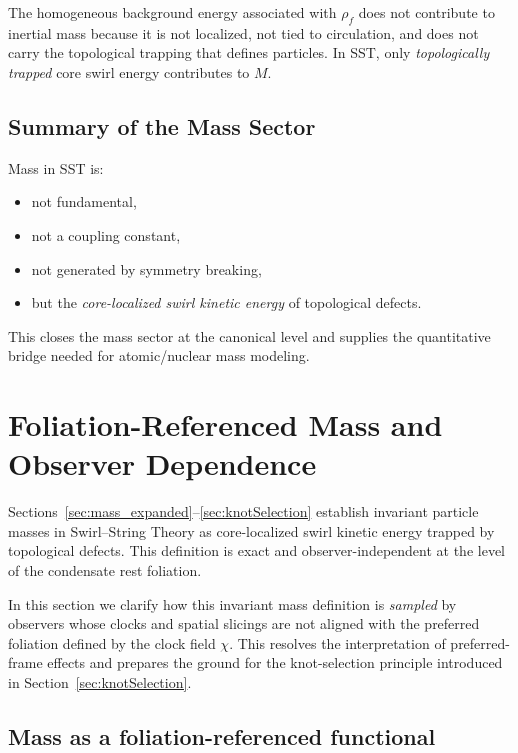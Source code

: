 \documentclass[10pt]{article}
\newcommand{\rhof}{\rho_{\!f}}                           %
\begin{document}
        The homogeneous background energy associated with $\rhof$ does not contribute to
        inertial mass because it is not localized, not tied to circulation, and does not
        carry the topological trapping that defines particles. In SST, only
        \emph{topologically trapped} core swirl energy contributes to $M$.

    \subsection{Summary of the Mass Sector}

        Mass in SST is:
        \begin{itemize}
            \item not fundamental,
            \item not a coupling constant,
            \item not generated by symmetry breaking,
            \item but the \emph{core-localized swirl kinetic energy} of topological defects.
        \end{itemize}

        This closes the mass sector at the canonical level and supplies the quantitative
        bridge needed for atomic/nuclear mass modeling.

    \section{Foliation-Referenced Mass and Observer Dependence}
    \label{sec:foliation_mass}

    Sections~\ref{sec:mass_expanded}--\ref{sec:knotSelection} establish invariant particle masses in Swirl--String Theory
    as core-localized swirl kinetic energy trapped by topological defects.
    This definition is exact and observer-independent at the level of the
    condensate rest foliation.

    In this section we clarify how this invariant mass definition is
    \emph{sampled} by observers whose clocks and spatial slicings are
    not aligned with the preferred foliation defined by the clock field $\chi$.
    This resolves the interpretation of preferred-frame effects and
    prepares the ground for the knot-selection principle introduced in
    Section~\ref{sec:knotSelection}.

    \subsection{Mass as a foliation-referenced functional}
\end{document}
